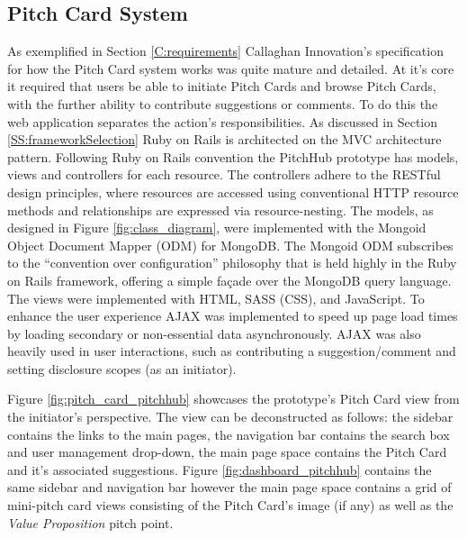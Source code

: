 \subsection{Pitch Card System}
As exemplified in Section \ref{C:requirements} Callaghan Innovation's specification for how the Pitch Card system works was quite mature and detailed. At it's core it required that users be able to initiate Pitch Cards and browse Pitch Cards, with the further ability to contribute suggestions or comments. To do this the web application separates the action's responsibilities. As discussed in Section \ref{SS:frameworkSelection} Ruby on Rails is architected on the MVC architecture pattern. Following Ruby on Rails convention the PitchHub prototype has models, views and controllers for each resource. The controllers adhere to the RESTful design principles, where resources are accessed using conventional HTTP resource methods and relationships are expressed via resource-nesting. The models, as designed in Figure \ref{fig:class_diagram}, were implemented with the Mongoid \cite{Mongo4:online} Object Document Mapper (ODM) for MongoDB. The Mongoid ODM subscribes to the ``convention over configuration'' philosophy that is held highly in the Ruby on Rails framework, offering a simple façade over the MongoDB query language. The views were implemented with HTML, SASS (CSS), and JavaScript. To enhance the user experience AJAX was implemented to speed up page load times by loading secondary or non-essential data asynchronously. AJAX was also heavily used in user interactions, such as contributing a suggestion/comment and setting disclosure scopes (as an initiator).
\par
Figure \ref{fig:pitch_card_pitchhub} showcases the prototype's Pitch Card view from the initiator's perspective. The view can be deconstructed as follows: the sidebar contains the links to the main pages, the navigation bar contains the search box and user management drop-down, the main page space contains the Pitch Card and it's associated suggestions. Figure \ref{fig:dashboard_pitchhub} contains the same sidebar and navigation bar however the main page space contains a grid of mini-pitch card views consisting of the Pitch Card's image (if any) as well as the \textit{Value Proposition} pitch point.


